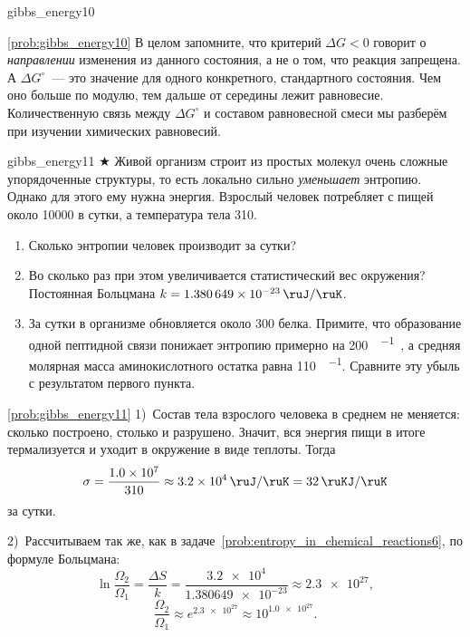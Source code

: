 \begin{problem}{}{gibbs_energy10}
\begin{sol}{\ref{prob:gibbs_energy10}}
        В целом запомните, что критерий $\Delta G < 0$ говорит о \emph{направлении} изменения из данного состояния, а не о том, что реакция запрещена. А $\Delta G^{\circ}$~--- это значение для одного конкретного, стандартного состояния. Чем оно больше по модулю, тем дальше от середины лежит равновесие. Количественную связь между $\Delta G^{\circ}$ и составом равновесной смеси мы разберём при изучении химических равновесий.
    \end{sol}
\end{problem}

\begin{problem}{}{gibbs_energy11}
    $\bigstar$ Живой организм строит из простых молекул очень сложные упорядоченные структуры, то есть локально сильно \emph{уменьшает} энтропию. Однако для этого ему нужна энергия. Взрослый человек потребляет с пищей около \qty{10000}{\ruKJ} в сутки, а температура тела \qty{310}{\ruK}.

    \begin{enumerate}[label=\arabic*)]
        \item Сколько энтропии человек производит за сутки?
        \item Во сколько раз при этом увеличивается статистический вес окружения? Постоянная Больцмана $k = \qty{1,380649e-23}{\ruJ\per\ruK}$.
        \item За сутки в организме обновляется около \qty{300}{\ruG} белка. Примите, что образование одной пептидной связи понижает энтропию примерно на \qty{200}{\ruJ\per\ruK\ruMole}, а средняя молярная масса аминокислотного остатка равна \qty{110}{\ruG\per\ruMole}. Сравните эту убыль с результатом первого пункта.
    \end{enumerate}
    \begin{sol}{\ref{prob:gibbs_energy11}}
        1)~Состав тела взрослого человека в среднем не меняется: сколько построено, столько и разрушено. Значит, вся энергия пищи в итоге термализуется и уходит в окружение в виде теплоты. Тогда
        \begin{equation*}
            \sigma = \frac{\num{1,0e7}}{\num{310}} \approx \num{3,2e4} \, \unit{\ruJ\per\ruK} = \qty{32}{\ruKJ\per\ruK}
        \end{equation*}
        за сутки.

        2)~Рассчитываем так же, как в задаче~\ref{prob:entropy_in_chemical_reactions6}, по формуле Больцмана:
        \begin{equation*}
            \ln \frac{\Omega_2}{\Omega_1} = \frac{\Delta S}{k} = \frac{\num{3,2e4}}{\num{1,380649e-23}} \approx \num{2,3e27},
        \end{equation*}
        \begin{equation*}
            \frac{\Omega_2}{\Omega_1} \approx e^{\num{2,3e27}} \approx 10^{\num{1,0e27}}.
        \end{equation*}


\end{sol}
\end{problem}
